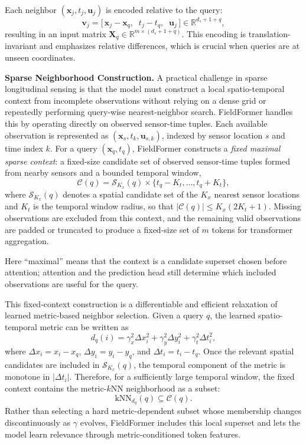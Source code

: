 Each neighbor $(\mathbf{x}_j, t_j, \mathbf{u}_j)$ is encoded relative to the query:
\[
\mathbf{v}_j = \big[\, \mathbf{x}_j - \mathbf{x}_q,\;\; t_j - t_q,\;\; \mathbf{u}_j \,\big] \in \mathbb{R}^{d_s+1+q},
\]
resulting in an input matrix $\mathbf{X}_q \in \mathbb{R}^{m \times (d_s+1+q)}$. This encoding is translation-invariant and emphasizes relative differences, which is crucial when queries are at unseen coordinates.

\noindent\textbf{Sparse Neighborhood Construction.}
A practical challenge in sparse longitudinal sensing is that the model must construct a local spatio-temporal context from incomplete observations without relying on a dense grid or repeatedly performing query-wise nearest-neighbor search. FieldFormer handles this by operating directly on observed sensor-time tuples. Each available observation is represented as $(\mathbf{x}_s,t_k,\mathbf{u}_{s,k})$, indexed by sensor location $s$ and time index $k$. For a query $(\mathbf{x}_q,t_q)$, FieldFormer constructs a \emph{fixed maximal sparse context}: a fixed-size candidate set of observed sensor-time tuples formed from nearby sensors and a bounded temporal window,
\[
\mathcal{C}(q)
=
\mathcal{S}_{K_x}(q)
\times
\{t_q-K_t,\ldots,t_q+K_t\},
\]
where $\mathcal{S}_{K_x}(q)$ denotes a spatial candidate set of the $K_x$ nearest sensor locations and $K_t$ is the temporal window radius, so that $|\mathcal{C}(q)|\le K_x(2K_t+1)$. Missing observations are excluded from this context, and the remaining valid observations are padded or truncated to produce a fixed-size set of $m$ tokens for transformer aggregation.

Here ``maximal'' means that the context is a candidate superset chosen before attention; attention and the prediction head still determine which included observations are useful for the query.

This fixed-context construction is a differentiable and efficient relaxation of learned metric-based neighbor selection. Given a query $q$, the learned spatio-temporal metric can be written as
\[
d_q(i)
=
\gamma_x^2 \Delta x_i^2
+
\gamma_y^2 \Delta y_i^2
+
\gamma_t^2 \Delta t_i^2,
\]
where $\Delta x_i=x_i-x_q$, $\Delta y_i=y_i-y_q$, and $\Delta t_i=t_i-t_q$. Once the relevant spatial candidates are included in $\mathcal{S}_{K_x}(q)$, the temporal component of the metric is monotone in $|\Delta t_i|$. Therefore, for a sufficiently large temporal window, the fixed context contains the metric-$k$NN neighborhood as a subset:
\[
\mathrm{kNN}_{d_q}(q) \subseteq \mathcal{C}(q).
\]
Rather than selecting a hard metric-dependent subset whose membership changes discontinuously as $\gamma$ evolves, FieldFormer includes this local superset and lets the model learn relevance through metric-conditioned token features.


